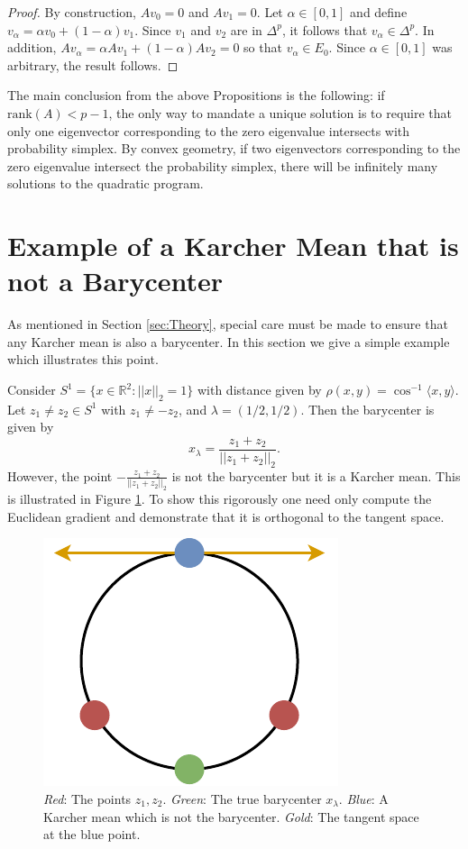\documentclass[nohyperref]{article}
\theoremstyle{definition}
\begin{document}
\begin{proof}
    By construction, $Av_{0}=0$ and $Av_{1}=0$. Let $\alpha\in [0,1]$ and define $v_{\alpha} = \alpha v_{0}+(1-\alpha)v_{1}$. Since $v_{1}$ and $v_{2}$ are in $\Delta^{p}$, it follows that $v_{\alpha}\in \Delta^{p}$. In addition, $Av_{\alpha}=\alpha Av_{1}+ (1-\alpha)Av_{2}=0$ so that $v_{\alpha}\in E_{0}$. Since $\alpha\in [0,1]$ was arbitrary, the result follows. \end{proof}
The main conclusion from the above Propositions is the following: if $\textrm{rank}(A)<p-1$, the only way to mandate a unique solution is to require that only one eigenvector corresponding to the zero eigenvalue intersects with probability simplex. By convex geometry, if two eigenvectors corresponding to the zero eigenvalue intersect the probability simplex, there will be infinitely many solutions to the quadratic program. 

\section{Example of a Karcher Mean that is not a Barycenter}
\label{sec:karcher_not_bc}
As mentioned in Section \ref{sec:Theory}, special care must be made to ensure that any Karcher mean is also a barycenter. In this section we give a simple example which illustrates this point.

Consider $S^1 = \{x \in \mathbb{R}^2 : ||x||_2 = 1 \}$ with distance given by $\rho(x,y) = \cos^{-1} \langle x, y \rangle$. Let $z_1 \neq z_2 \in S^1$ with $z_1 \neq -z_2$, and $\lambda = (1/2,1/2)$. Then the barycenter is given by $$x_{\lambda} = \frac{z_1 + z_2}{||z_1 + z_2||_2}.$$
However, the point $-\frac{z_1 + z_2}{||z_1 + z_2||_2}$ is not the barycenter but it is a Karcher mean. This is illustrated in Figure \ref{fig:karcher_not_bc}.  To show this rigorously one need only compute the Euclidean gradient and demonstrate that it is orthogonal to the tangent space.

\makeatletter
\setlength{\@fptop}{10pt}
\makeatother

\begin{figure}[t]
    \centering
    \includegraphics[width=0.3\linewidth]{figures/supplement/karcher_not_bc.pdf}
    \caption{\emph{Red}: The points $z_{1},z_2$. \emph{Green}: The true barycenter $x_{\lambda}$. \emph{Blue}: A Karcher mean which is not the barycenter. \emph{Gold}: The tangent space at the blue point.}
    \label{fig:karcher_not_bc}
\end{figure}
\end{document}
